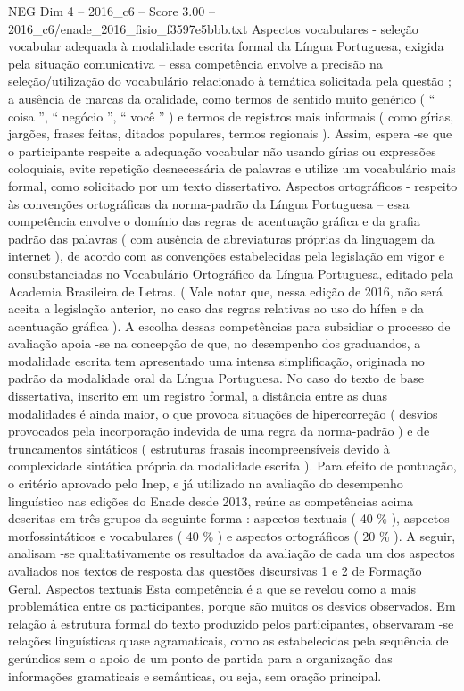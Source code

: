 \begin{textsample}{NEG Dim 4 – 2016\_c6 – Score 3.00 – 2016\_c6/enade\_2016\_fisio\_f3597e5bbb.txt}
Aspectos vocabulares - seleção vocabular adequada à modalidade escrita formal da Língua Portuguesa, exigida pela situação comunicativa – essa competência envolve a precisão na seleção/utilização do vocabulário relacionado à temática solicitada pela questão ; a ausência de marcas da oralidade, como termos de sentido muito genérico ( “ coisa ”, “ negócio ”, “ você ” ) e termos de registros mais informais ( como gírias, jargões, frases feitas, ditados populares, termos regionais ).
Assim, espera -se que o participante respeite a adequação vocabular não usando gírias ou expressões coloquiais, evite repetição desnecessária de palavras e utilize um vocabulário mais formal, como solicitado por um texto dissertativo.
Aspectos ortográficos - respeito às convenções ortográficas da norma-padrão da Língua Portuguesa – essa competência envolve o domínio das regras de acentuação gráfica e da grafia padrão das palavras ( com ausência de abreviaturas próprias da linguagem da internet ), de acordo com as convenções estabelecidas pela legislação em vigor e consubstanciadas no Vocabulário Ortográfico da Língua Portuguesa, editado pela Academia Brasileira de Letras. ( Vale notar que, nessa edição de 2016, não será aceita a legislação anterior, no caso das regras relativas ao uso do hífen e da acentuação gráfica ).
A escolha dessas competências para subsidiar o processo de avaliação apoia -se na concepção de que, no desempenho dos graduandos, a modalidade escrita tem apresentado uma intensa simplificação, originada no padrão da modalidade oral da Língua Portuguesa.
No caso do texto de base dissertativa, inscrito em um registro formal, a distância entre as duas modalidades é ainda maior, o que provoca situações de hipercorreção ( desvios provocados pela incorporação indevida de uma regra da norma-padrão ) e de truncamentos sintáticos ( estruturas frasais incompreensíveis devido à complexidade sintática própria da modalidade escrita ).
Para efeito de pontuação, o critério aprovado pelo Inep, e já utilizado na avaliação do desempenho linguístico nas edições do Enade desde 2013, reúne as competências acima descritas em três grupos da seguinte forma : aspectos textuais ( 40 \% ), aspectos morfossintáticos e vocabulares ( 40 \% ) e aspectos ortográficos ( 20 \% ).
A seguir, analisam -se qualitativamente os resultados da avaliação de cada um dos aspectos avaliados nos textos de resposta das questões discursivas 1 e 2 de Formação Geral.
Aspectos textuais Esta competência é a que se revelou como a mais problemática entre os participantes, porque são muitos os desvios observados.
Em relação à estrutura formal do texto produzido pelos participantes, observaram -se relações linguísticas quase agramaticais, como as estabelecidas pela sequência de gerúndios sem o apoio de um ponto de partida para a organização das informações gramaticais e semânticas, ou seja, sem oração principal.

\end{textsample}
